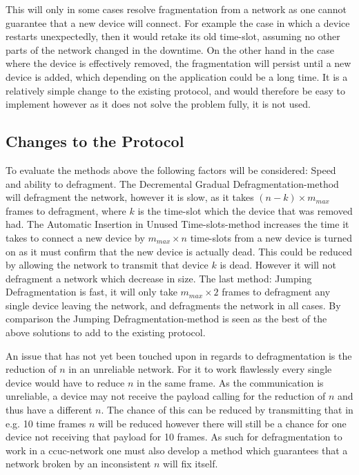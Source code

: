 
\bigskip \noindent
This will only in some cases resolve fragmentation from a network as one cannot guarantee that a new device will connect. 
For example the case in which a device restarts unexpectedly, then it would retake its old time-slot, assuming no other parts of the network changed in the downtime.
On the other hand in the case where the device is effectively removed, the fragmentation will persist until a new device is added, which depending on the application could be a long time.
It is a relatively simple change to the existing protocol, and would therefore be easy to implement however as it does not solve the problem fully, it is not used. 

\subsection{Changes to the Protocol}
To evaluate the methods above the following factors will be considered: Speed and ability to defragment.
The Decremental Gradual Defragmentation-method will defragment the network, however it is slow, as it takes $(n - k) \times m_{max}$ frames to defragment, where $k$ is the time-slot which the device  that was removed had. 
The Automatic Insertion in Unused Time-slots-method increases the time it takes to connect a new device by $m_{max} \times n$ time-slots from a new device is turned on as it must confirm that the new device is actually dead.
This could be reduced by allowing the network to transmit that device $k$ is dead.
However it will not defragment a network which decrease in size. 
The last method: Jumping Defragmentation is fast, it will only take $m_{max} \times 2$ frames to defragment any single device leaving the network, and defragments the network in all cases. 
By comparison the Jumping Defragmentation-method is seen as the best of the above solutions to add to the existing protocol. 

\bigskip \noindent
An issue that has not yet been touched upon in regards to defragmentation is the reduction of $n$ in an unreliable network.
For it to work flawlessly every single device would have to reduce $n$ in the same frame.
As the communication is unreliable, a device may not receive the payload calling for the reduction of $n$ and thus have a different $n$.
The chance of this can be reduced by transmitting that in e.g. 10 time frames $n$ will be reduced however there will still be a chance for one device not receiving that payload for 10 frames.
As such for defragmentation to work in a \gls{ccuc}-network one must also develop a method which guarantees that a network broken by an inconsistent $n$ will fix itself.